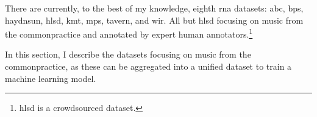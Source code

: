 
There are currently, to the best of my knowledge, eighth
\gls{rna} datasets: \gls{abc}, \gls{bps}, \gls{haydnsun},
\gls{hlsd}, \gls{kmt}, \gls{mps}, \gls{tavern}, and
\gls{wir}. All but \gls{hlsd} focusing on music from the
\gls{commonpractice} and annotated by expert human
annotators.\footnote{\gls{hlsd} is a crowdsourced dataset.}

In this section, I describe the datasets focusing on music
from the \gls{commonpractice}, as these can be aggregated
into a unified dataset to train a machine learning model.
